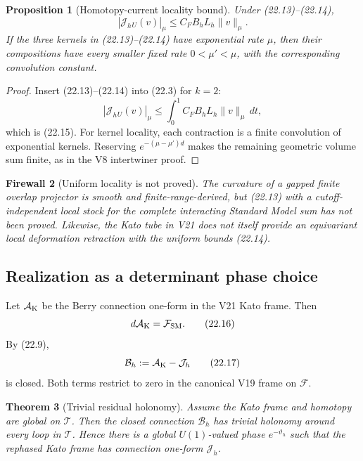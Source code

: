 \documentclass[11pt]{article}
\newtheorem{theorem}{Theorem}[section]
\newtheorem{proposition}[theorem]{Proposition}
\newtheorem{firewall}[theorem]{Firewall}
\begin{document}
\begin{proposition}[Homotopy-current locality bound]
\label{prop:v11v22-locality}
Under (22.13)--(22.14),
\[
 |\mathcal J_h{}_U(v)|_\mu
 \leq C_FB_hL_h\|v\|_\mu.
 \tag{22.15}
\]
If the three kernels in (22.13)--(22.14) have exponential rate \(\mu\),
then their compositions have every smaller fixed rate
\(0<\mu'<\mu\), with the corresponding convolution constant.
\end{proposition}

\begin{proof}
Insert (22.13)--(22.14) into (22.3) for \(k=2\):
\[
 |\mathcal J_h{}_U(v)|_\mu
 \leq
 \int_0^1 C_F B_h L_h\|v\|_\mu\,dt,
\]
which is (22.15).  For kernel locality, each contraction is a finite
convolution of exponential kernels.  Reserving
\(e^{-(\mu-\mu')d}\) makes the remaining geometric volume sum finite,
as in the V8 intertwiner proof.
\end{proof}

\begin{firewall}[Uniform locality is not proved]
\label{fw:v11v22-locality}
The curvature of a gapped finite overlap projector is smooth and
finite-range-derived, but (22.13) with a cutoff-independent local stock
for the complete interacting Standard Model sum has not been proved.
Likewise, the Kato tube in V21 does not itself provide an equivariant
local deformation retraction with the uniform bounds (22.14).
\end{firewall}

\subsection{Realization as a determinant phase choice}

Let \(\mathcal A_{\rm K}\) be the Berry connection one-form in the V21
Kato frame.  Then
\[
 d\mathcal A_{\rm K}=\mathcal F_{\rm SM}.
 \tag{22.16}
\]
By (22.9),
\[
 \mathcal B_h:=\mathcal A_{\rm K}-\mathcal J_h
 \tag{22.17}
\]
is closed.  Both terms restrict to zero in the canonical V19 frame on
\(\mathcal F\).

\begin{theorem}[Trivial residual holonomy]
\label{thm:v11v22-residual-holonomy}
Assume the Kato frame and homotopy are global on \(\mathcal T\).
Then the closed connection \(\mathcal B_h\) has trivial holonomy around
every loop in \(\mathcal T\).  Hence there is a global \(U(1)\)-valued
phase \(e^{-\vartheta_h}\) such that the rephased Kato frame has connection
one-form \(\mathcal J_h\).
\end{theorem}
\end{document}
